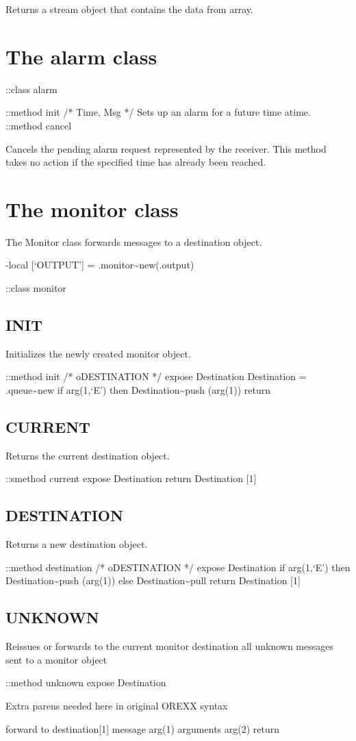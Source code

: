 Returns a stream object that contains the data from array.

\section{The alarm class}\label{the-alarm-class}

::class alarm

::method init /* Time, Msg */ Sets up an alarm for a future time atime.
::method cancel

Cancels the pending alarm request represented by the receiver. This
method takes no action if the specified time has already been reached.

\section{The monitor class}\label{the-monitor-class}

The Monitor class forwards messages to a destination object.

-local {[}`OUTPUT'{]} = .monitor\textasciitilde new(.output)

::class monitor

\subsection{INIT}\label{init-1}

Initializes the newly created monitor object.

::method init /* oDESTINATION */ expose Destination Destination =
.queue\textasciitilde new if arg(1,`E') then
Destination\textasciitilde push (arg(1)) return

\subsection{CURRENT}\label{current}

Returns the current destination object.

::smethod current expose Destination return Destination {[}1{]}

\subsection{DESTINATION}\label{destination}

Returns a new destination object.

::method destination /* oDESTINATION */ expose Destination if arg(1,`E')
then Destination\textasciitilde push (arg(1)) else
Destination\textasciitilde pull return Destination {[}1{]}

\subsection{UNKNOWN}\label{unknown-1}

Reissues or forwards to the current monitor destination all unknown
messages sent to a monitor object

::method unknown expose Destination

Extra parens needed here in original OREXX syntax

forward to destination{[}1{]} message arg(1) arguments arg(2) return
